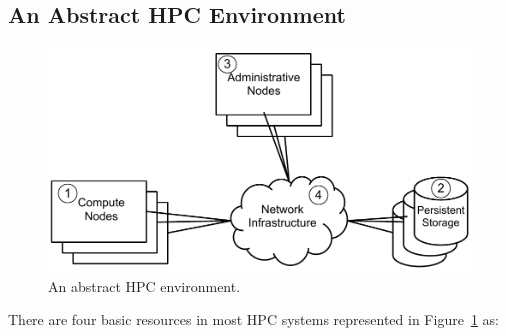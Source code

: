 \documentclass{llncs}
\begin{document}
\subsection{An Abstract HPC Environment}
\begin{figure}
\centering
\includegraphics[scale=0.5]{abstract_hpc_environment.pdf}
\caption{An abstract HPC environment.}
\label{fig:abstract_hpc_environment}
\end{figure}
There are four basic resources in most HPC systems represented in Figure~\ref{fig:abstract_hpc_environment} as: 
\end{document}
